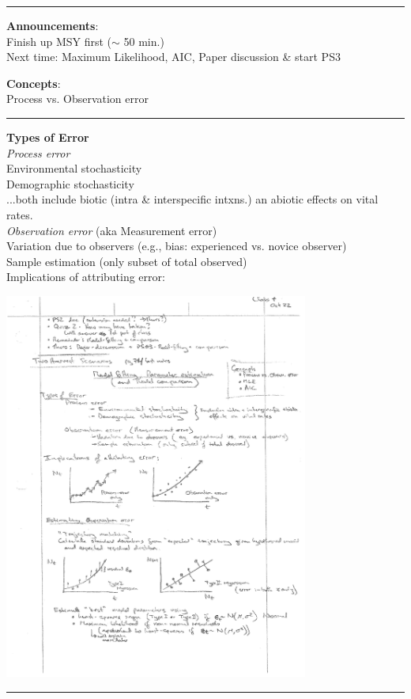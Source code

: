 \documentclass{article}
\newcommand{\ind}{\-\hspace{1cm}}
\begin{document}
\noindent{}

\rule[0.5ex]{\linewidth}{1pt}
\textbf{Announcements}:\\
Finish up MSY first ($\sim$ 50 min.)\\
Next time: Maximum Likelihood, AIC, Paper discussion \& start PS3

\textbf{Concepts}: \\
Process vs. Observation error

\rule[0.5ex]{\linewidth}{1pt}
\textbf{Types of Error}\\
\emph{Process error}\\
\ind Environmental stochasticity\\
\ind Demographic stochasticity\\
\ind \ind ...both include biotic (intra \& interspecific intxns.) an abiotic effects on vital rates.\\
\emph{Observation error} (aka Measurement error)\\
\ind Variation due to observers (e.g., bias: experienced vs. novice observer)\\
\ind Sample estimation (only subset of total observed)\\

Implications of attributing error:
\begin{center}
\includegraphics[width=10cm]{figs/image0.pdf}
\end{center}
\rule[0.5ex]{\linewidth}{1pt}
\end{document}
